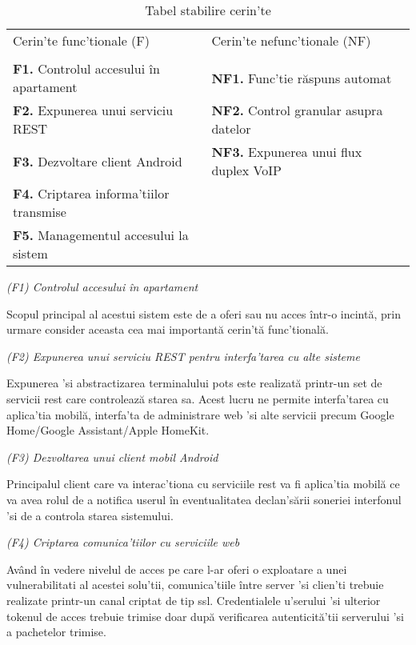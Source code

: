 \begin{table}[ht!]
\begin{tabular}{l|l}
\hline
Cerin'te func'tionale (F) & Cerin'te nefunc'tionale (NF) \\
 & \\
\hline
\hline
\textbf{F1.} Controlul accesului în apartament & \textbf{NF1.} Func'tie răspuns automat \\
\hline
\textbf{F2.} Expunerea unui serviciu REST & \textbf{NF2.} Control granular asupra datelor \\
\hline
\textbf{F3.} Dezvoltare client Android & \textbf{NF3.} Expunerea unui flux duplex VoIP \\
\hline
\textbf{F4.} Criptarea informa'tiilor transmise & \\
\hline
\textbf{F5.} Managementul accesului la sistem & \\
\hline
\end{tabular}
\centering
\caption{Tabel stabilire cerin'te}
\label{tab:funcnefunc}
\end{table}

\noindent
\textit{(F1) Controlul accesului în apartament}

Scopul principal al acestui sistem este de a oferi sau nu acces într-o incintă, prin urmare consider aceasta cea mai importantă cerin'tă func'tională.

\noindent
\textit{(F2) Expunerea unui serviciu REST pentru interfa'tarea cu alte sisteme}

Expunerea 'si abstractizarea terminalului \acrshort{pots} este realizată printr-un set de servicii \acrfull{rest} care controlează starea sa. Acest lucru ne permite interfa'tarea cu aplica'tia mobilă, interfa'ta de administrare web 'si alte servicii precum Google Home/Google Assistant/Apple HomeKit.

\noindent
\textit{(F3) Dezvoltarea unui client mobil Android}

Principalul client care va interac'tiona cu serviciile \acrshort{rest} va fi aplica'tia mobilă ce va avea rolul de a notifica userul în eventualitatea declan'sării soneriei interfonul 'si de a controla starea sistemului.

\noindent
\textit{(F4) Criptarea comunica'tiilor cu serviciile web}

Având în vedere nivelul de acces pe care l-ar oferi o exploatare a unei vulnerabilitati al acestei solu'tii, comunica'tiile între server 'si clien'ti trebuie realizate printr-un canal criptat de tip \acrfull{ssl}. Credentialele u'serului 'si ulterior tokenul de acces trebuie trimise doar după verificarea autenticită'tii serverului 'si a pachetelor trimise.

